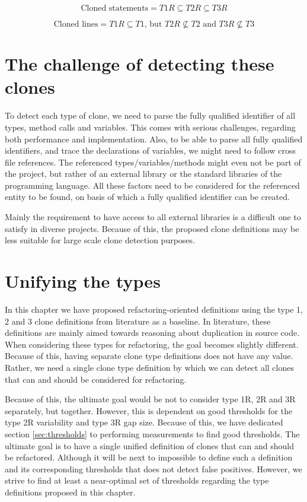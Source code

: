 \begin{equation}\label{eq:typerelation}
\text{Cloned statements} = T1R \subseteq T2R \subseteq T3R
\end{equation}

\begin{equation}\label{eq:typerelation2}
\text{Cloned lines} = T1R \subseteq T1 \text{, but } T2R	\nsubseteq T2 \text{ and } T3R \nsubseteq T3
\end{equation}

\section{The challenge of detecting these clones}\label{chap:challenge}
To detect each type of clone, we need to parse the fully qualified identifier of all types, method calls and variables. This comes with serious challenges, regarding both performance and implementation. Also, to be able to parse all fully qualified identifiers, and trace the declarations of variables, we might need to follow cross file references. The referenced types/variables/methods might even not be part of the project, but rather of an external library or the standard libraries of the programming language. All these factors need to be considered for the referenced entity to be found, on basis of which a fully qualified identifier can be created.

Mainly the requirement to have access to all external libraries is a difficult one to satisfy in diverse projects. Because of this, the proposed clone definitions may be less suitable for large scale clone detection purposes.

\section{Unifying the types}\label{sec:unifying}
In this chapter we have proposed refactoring-oriented definitions using the type 1, 2 and 3 clone definitions from literature as a baseline. In literature, these definitions are mainly aimed towards reasoning about duplication in source code. When considering these types for refactoring, the goal becomes slightly different. Because of this, having separate clone type definitions does not have any value. Rather, we need a single clone type definition by which we can detect all clones that can and should be considered for refactoring.

Because of this, the ultimate goal would be not to consider type 1R, 2R and 3R separately, but together. However, this is dependent on good thresholds for the type 2R variability and type 3R gap size. Because of this, we have dedicated section \ref{sec:thresholds} to performing measurements to find good thresholds. The ultimate goal is to have a single unified definition of clones that can and should be refactored. Although it will be next to impossible to define such a definition and its corresponding thresholds that does not detect false positives. However, we strive to find at least a near-optimal set of thresholds regarding the type definitions proposed in this chapter.

